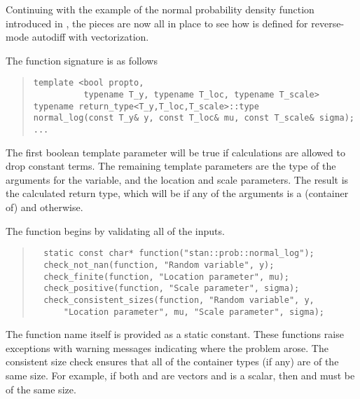 \documentclass[10pt]{article}
\begin{document}
Continuing with the example of the normal probability density function
introduced in , the pieces are now
all in place to see how  is defined for reverse-mode
autodiff with vectorization.

The function signature is as follows
%
\begin{quote}
\begin{Verbatim}
template <bool propto, 
          typename T_y, typename T_loc, typename T_scale>
typename return_type<T_y,T_loc,T_scale>::type
normal_log(const T_y& y, const T_loc& mu, const T_scale& sigma);
... 
\end{Verbatim}
\end{quote}
%
The first boolean template parameter will be true if calculations are
allowed to drop constant terms.  The remaining template parameters are
the type of the arguments for the variable, and the location and scale
parameters.  The result is the calculated return type, which will be
 if any of the arguments is a (container of)  and
 otherwise.

The function begins by validating all of the inputs.
%
\begin{quote}
\begin{Verbatim}
  static const char* function("stan::prob::normal_log");
  check_not_nan(function, "Random variable", y);
  check_finite(function, "Location parameter", mu);
  check_positive(function, "Scale parameter", sigma);
  check_consistent_sizes(function, "Random variable", y,
      "Location parameter", mu, "Scale parameter", sigma);
\end{Verbatim}
\end{quote}
%
The function name itself is provided as a static constant.  These
functions raise exceptions with warning messages indicating where the
problem arose.  The consistent size check ensures that all of the
container types (if any) are of the same size.  For example, if both
 and  are vectors and  is a scalar, then
 and  must be of the same size.
\end{document}
